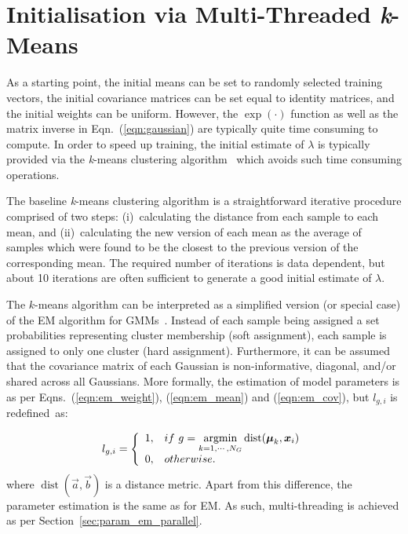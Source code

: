 \vspace{4ex}
\section{Initialisation via Multi-Threaded {\it k}-Means}
\label{sec:param_km}
\vspace{1ex}

As a starting point, the initial means can be set to randomly selected training vectors,
the initial covariance matrices can be set equal to identity matrices, 
and the initial weights can be uniform.
However, the $\exp(\cdot)$ function as well as the matrix inverse in Eqn.~(\ref{eqn:gaussian}) are typically quite time consuming to compute.
In order to speed up training, the initial estimate of $\lambda$ is typically provided via the {\it k}-means clustering algorithm~\cite{Bishop_2006,Duda01,Kulis_2012}
which avoids such time consuming operations.

The baseline {\it k}-means clustering algorithm is a straightforward iterative procedure comprised of two steps:
(i)~calculating the distance from each sample to each mean,
and
(ii)~calculating the new version of each mean as the average of samples which were found to be the closest to the previous version of the corresponding mean.
The required number of iterations is data dependent,
but about 10 iterations are often sufficient to generate a good initial estimate of $\lambda$.

The $k$-means algorithm can be interpreted as a simplified version (or special case) of the EM algorithm for GMMs~\cite{Kulis_2012}.
Instead of each sample being assigned a set probabilities representing cluster membership (soft assignment),
each sample is assigned to only one cluster (hard assignment).
Furthermore, it can be assumed that the covariance matrix of each Gaussian is non-informative, diagonal, and/or shared across all Gaussians.
More formally, the estimation of model parameters is as per Eqns.~(\ref{eqn:em_weight}), (\ref{eqn:em_mean}) and (\ref{eqn:em_cov}), 
but $l_{g,i}$ is redefined~as:%

\begin{equation}
  l_{g,i} = \left\{
  \begin{array}{ll}
  1, & \mbox{if} ~ g = \argmin\limits_{k=1, \cdots, N_G} \operatorname{dist}(\Vec{\mu}_k, \Vec{x}_i) \\
  0, & \mbox{otherwise}.
  \end{array}
  \right.
  \label{eqn:binary_likelihood}
\end{equation}
%
where {$\operatorname{dist}(\Vec{a}, \Vec{b})$} is a distance metric.
Apart from this difference, the parameter estimation is the same as for EM.
As such, multi-threading is achieved as per Section~\ref{sec:param_em_parallel}.


